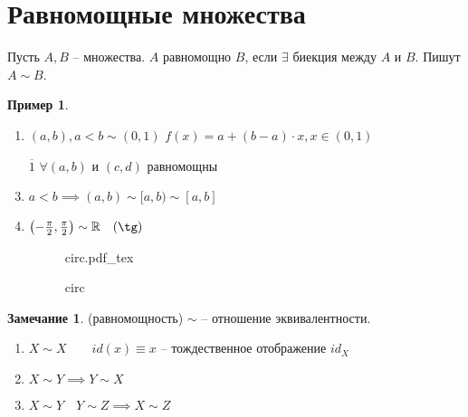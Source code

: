 \documentclass{book}
\newcommand\R{\ensuremath{\mathbb{R}}}
\newcommand{\ov}[1]{\overline{#1}}
\theoremstyle{definition}
\newtheorem*{note}{Замечание}
\newtheorem*{example}{Пример}
\newcommand{\incfig}[1]{%
    \def\svgwidth{\columnwidth}
    {#1.pdf_tex}
}
\begin{document}
    \section{Равномощные множества}

    \begin{definition}
        Пусть $A,B$ -- множества.
        $A$ равномощно $B$, если $\exists $ биекция между $A$ и $B$. 
        Пишут  $A\sim B$.
    \end{definition}
    \begin{example}
        \begin{enumerate}
            \item $(a,b), a<b \sim (0,1)$
            $f(x) = a+(b-a)\cdot x, x\in (0,1)$
            \item[$\ov{1}$] $\forall (a,b)$ и $(c,d)$ равномощны
            \item $a<b \implies (a,b)\sim [a,b) \sim [a,b]$
            \item $\left( -\frac{\pi}{2}, \frac{\pi }{2} \right) \sim \R\quad (\tg)$
	    \begin{figure}[ht]
		\centering
		\incfig{circ}
		\caption{circ}
		\label{fig:circ}
	    \end{figure}
        \end{enumerate}
    \end{example}

    \begin{note}
        (равномощность) $\sim $ -- отношение эквивалентности.

        \begin{enumerate}
            \item $X\sim X\qquad id(x) \equiv x$ -- тождественное отображение $id_X$
            \item $X\sim Y \implies  Y\sim X$
            \item $X\sim Y\quad Y\sim Z \implies X\sim Z$
        \end{enumerate}
    \end{note}
\end{document}
